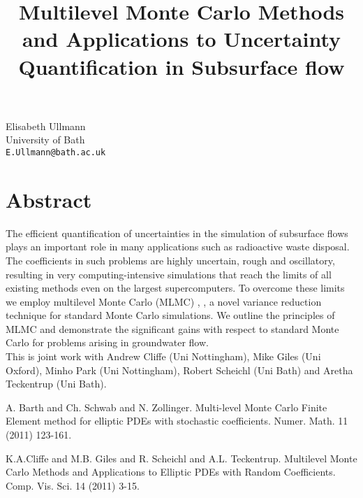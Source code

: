 \title{Multilevel Monte Carlo Methods and Applications to Uncertainty Quantification in Subsurface flow}
 \author{} \institute{}
\maketitle
\begin{center}
{\large Elisabeth  Ullmann}\\
University of Bath\\
{\tt E.Ullmann@bath.ac.uk}

\end{center}

\section*{Abstract}

The efficient quantification of uncertainties in the simulation of subsurface flows plays an important role in many applications such as radioactive waste disposal. The coefficients in such problems are highly uncertain, rough and oscillatory, resulting in very computing-intensive simulations that reach the limits of all existing methods even on the largest supercomputers. To overcome these limits we employ multilevel Monte Carlo (MLMC) \cite{BSZ:2011}, \cite{CGS:2011}, a novel variance reduction technique for standard Monte Carlo simulations. We outline the principles of MLMC and demonstrate the significant gains with respect to standard Monte Carlo for problems arising in groundwater flow.\\

\noindent This is joint work with Andrew Cliffe (Uni Nottingham), Mike Giles (Uni Oxford), Minho Park (Uni Nottingham), Robert Scheichl (Uni Bath) and Aretha Teckentrup (Uni Bath).



\begin{thebibliography}{10}

{\sc A. Barth and Ch. Schwab and N. Zollinger}. {Multi-level Monte Carlo Finite Element method for elliptic PDEs with stochastic coefficients}. Numer. Math. 11 (2011) 123-161.



{\sc K.A.Cliffe  and M.B. Giles and R. Scheichl and A.L. Teckentrup}. {Multilevel Monte Carlo Methods and Applications to Elliptic PDEs with Random Coefficients}. Comp. Vis. Sci. 14 (2011) 3-15.

\end{thebibliography}

